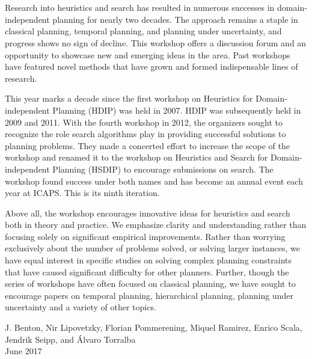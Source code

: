 \section*{}
Research into heuristics and search has resulted in numerous successes
in domain-independent planning for nearly two decades. The approach
remains a staple in classical planning, temporal planning, and planning
under uncertainty, and progress shows no sign of decline. This workshop
offers a discussion forum and an opportunity to showcase new and
emerging ideas in the area. Past workshops have featured novel methods
that have grown and formed indispensable lines of research.

This year marks a decade since the first workshop on Heuristics for
Domain-independent Planning (HDIP) was held in 2007. HDIP was
subsequently held in 2009 and 2011. With the fourth workshop in 2012,
the organizers sought to recognize the role search algorithms play in
providing successful solutions to planning problems. They made a
concerted effort to increase the scope of the workshop and renamed it
to the workshop on Heuristics and Search for Domain-independent
Planning (HSDIP) to encourage submissions on search. The workshop found
success under both names and has become an annual event each year at
ICAPS. This is its ninth iteration.

Above all, the workshop encourages innovative ideas for heuristics and
search both in theory and practice. We emphasize clarity and
understanding rather than focusing solely on significant empirical
improvements. Rather than worrying exclusively about the number of
problems solved, or solving larger instances, we have equal interest in
specific studies on solving complex planning constraints that have
caused significant difficulty for other planners. Further, though the
series of workshops have often focused on classical planning, we have
sought to encourage papers on temporal planning, hierarchical planning,
planning under uncertainty and a variety of other topics.

\bigskip
\begin{flushright}
J. Benton, Nir Lipovetzky, Florian Pommerening, Miquel Ramirez,
Enrico Scala, Jendrik Seipp, and \'{A}lvaro Torralba\\
June 2017
\end{flushright}
